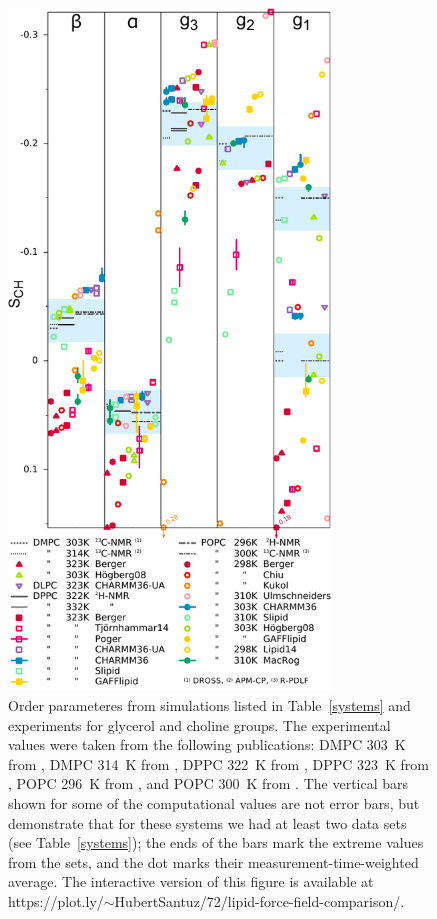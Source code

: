 \documentclass[journal=jpcbfk,manuscript=article]{achemso}
\begin{document}
\begin{figure}[]
  \includegraphics[width=8.6cm]{../DATAreportediINblog/comparisonSorted.pdf}
\newline
  \caption{\label{HGorderparameters}
  Order parameteres from simulations listed in Table~\ref{systems} and experiments for glycerol and choline groups.
The experimental values were taken from the following publications:
 DMPC 303~K from \cite{gross97},
 DMPC 314~K from \cite{dvinskikh05a},
 DPPC 322~K from \cite{gally75},
 DPPC 323~K from \cite{akutsu81},
 POPC 296~K from \cite{bechinger91}, and
 POPC 300~K from \cite{ferreira13}.
  The vertical bars shown for some of the computational values are not error bars, but demonstrate that for 
these systems we had at least two data sets (see Table~\ref{systems});
the ends of the bars mark the extreme values from the sets, and the dot marks their measurement-time-weighted average. 
The interactive version of this figure is available at  https://plot.ly/$\sim$HubertSantuz/72/lipid-force-field-comparison/.
} 
\end{figure}
\end{document}
